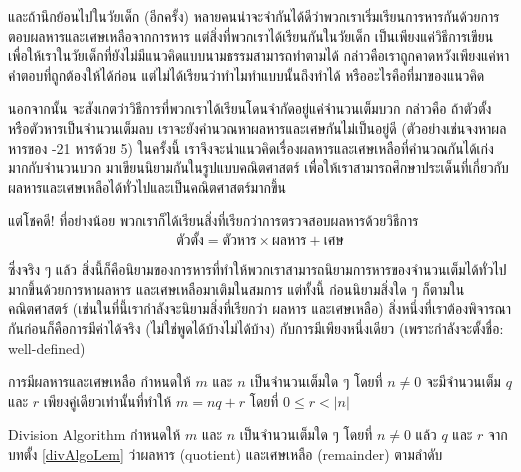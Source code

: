 และถ้านึกย้อนไปในวัยเด็ก (อีกครั้ง) หลายคนน่าจะจำกันได้ดีว่าพวกเราเริ่มเรียนการหารกันด้วยการตอบผลหารและเศษเหลือจากการหาร แต่สิ่งที่พวกเราได้เรียนกันในวัยเด็ก เป็นเพียงแค่วิธีการเขียนเพื่อให้เราในวัยเด็กที่ยังไม่มีแนวคิดแบบนามธรรมสามารถทำตามได้ กล่าวคือเราถูกคาดหวังเพียงแค่หาคำตอบที่ถูกต้องให้ได้ก่อน แต่ไม่ได้เรียนว่าทำไมทำแบบนั้นถึงทำได้ หรืออะไรคือที่มาของแนวคิด

นอกจากนั้น จะสังเกตว่าวิธีการที่พวกเราได้เรียนโดนจำกัดอยู่แค่จำนวนเต็มบวก
กล่าวคือ ถ้าตัวตั้งหรือตัวหารเป็นจำนวนเต็มลบ เราจะยังคำนวณหาผลหารและเศษกันไม่เป็นอยู่ดี (ตัวอย่างเช่นจงหาผลหารของ -21 หารด้วย 5)
ในครั้งนี้ เราจึงจะนำแนวคิดเรื่องผลหารและเศษเหลือที่คำนวณกันได้เก่งมากกับจำนวนบวก มาเขียนนิยามกันในรูปแบบคณิตศาสตร์ เพื่อให้เราสามารถศึกษาประเด็นที่เกี่ยวกับผลหารและเศษเหลือได้ทั่วไปและเป็นคณิตศาสตร์มากขึ้น

แต่โชคดี! ที่อย่างน้อย พวกเราก็ได้เรียนสิ่งที่เรียกว่าการตรวจสอบผลหารด้วยวิธีการ
$$
\text{ตัวตั้ง} = \text{ตัวหาร}\times\text{ผลหาร} + \text{เศษ}
$$

ซึ่งจริง ๆ แล้ว สิ่งนี้ก็คือนิยามของการหารที่ทำให้พวกเราสามารถนิยามการหารของจำนวนเต็มได้ทั่วไปมากขึ้นด้วยการหาผลหาร และเศษเหลือมาเติมในสมการ แต่ทั้งนี้ ก่อนนิยามสิ่งใด ๆ ก็ตามในคณิตศาสตร์ (เช่นในที่นี้เรากำลังจะนิยามสิ่งที่เรียกว่า ผลหาร และเศษเหลือ) สิ่งหนึ่งที่เราต้องพิจารณากันก่อนก็คือการมีค่าได้จริง (ไม่ใช่พูดได้บ้างไม่ได้บ้าง) กับการมีเพียงหนึ่งเดียว (เพราะกำลังจะตั้งชื่อ: well-defined)

\begin{lem}[label=divAlgoLem]{การมีผลหารและเศษเหลือ}{}
	กำหนดให้ $m$ และ $n$ เป็นจำนวนเต็มใด ๆ โดยที่ $n\neq 0$ จะมีจำนวนเต็ม $q$ และ $r$ เพียงคู่เดียวเท่านั้นที่ทำให้ $m = nq + r$ โดยที่ $0\leq r < |n|$
\end{lem}

\begin{defn}{Division Algorithm}{}
	กำหนดให้ $m$ และ $n$ เป็นจำนวนเต็มใด ๆ โดยที่ $n\neq 0$ แล้ว $q$ และ $r$ จากบทตั้ง \ref{divAlgoLem} ว่าผลหาร (quotient) และเศษเหลือ (remainder) ตามลำดับ
\end{defn}













